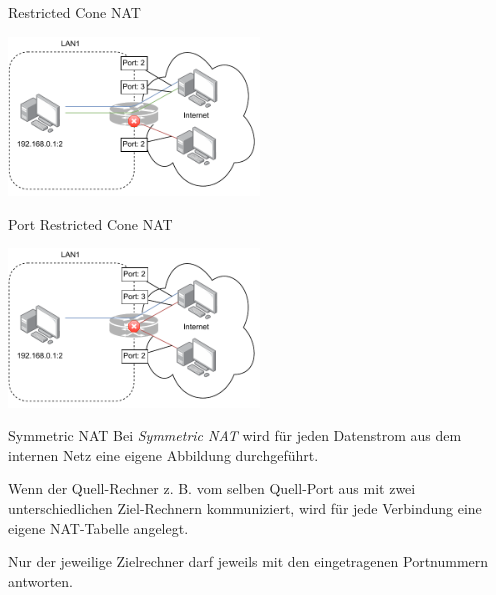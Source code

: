 \begin{example}{Restricted Cone NAT}
    \begin{center}
        \includegraphics[width=0.5\textwidth]{includes/figures/bonus_restricted_cone_nat.pdf}
    \end{center}
\end{example}

\begin{example}{Port Restricted Cone NAT}
    \begin{center}
        \includegraphics[width=0.5\textwidth]{includes/figures/bonus_port_restricted_cone_nat.pdf}
    \end{center}
\end{example}

\begin{bonus}{Symmetric NAT}
    Bei \emph{Symmetric NAT} wird für jeden Datenstrom aus dem internen Netz eine eigene Abbildung durchgeführt.

    Wenn der Quell-Rechner z. B. vom selben Quell-Port aus mit zwei unterschiedlichen Ziel-Rechnern kommuniziert, wird für jede Verbindung eine eigene NAT-Tabelle angelegt.

    Nur der jeweilige Zielrechner darf jeweils mit den eingetragenen Portnummern antworten.
\end{bonus}